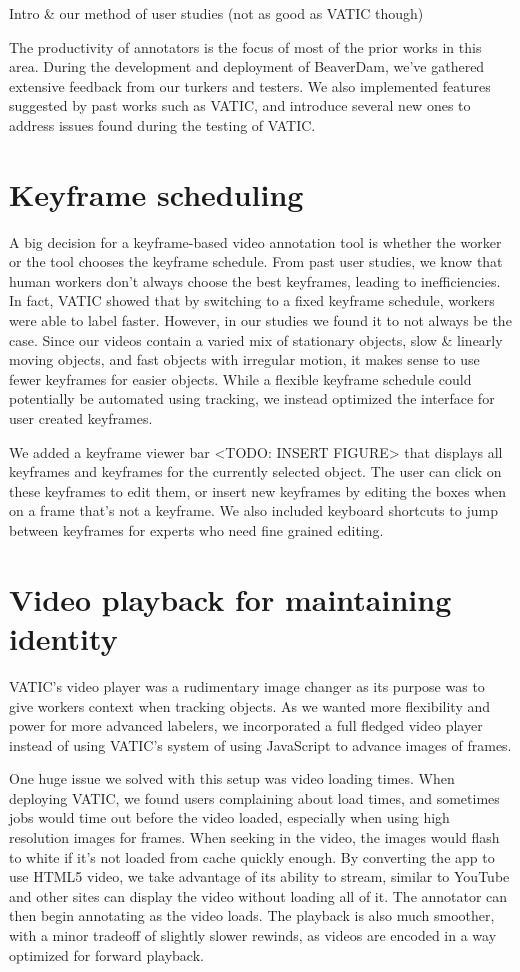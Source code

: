 
Intro \& our method of user studies (not as good as VATIC though)

The productivity of annotators is the focus of most of the prior works in this area.
During the development and deployment of BeaverDam, we've gathered extensive feedback from our turkers and testers.
We also implemented features suggested by past works such as VATIC,
and introduce several new ones to address issues found during the testing of VATIC.

\section{Keyframe scheduling}

A big decision for a keyframe-based video annotation tool is whether the worker or the tool chooses the keyframe schedule. 
From past user studies, we know that human workers don't always choose the best keyframes, leading to inefficiencies. 
In fact, VATIC showed that by switching to a fixed keyframe schedule, workers were able to label faster.
However, in our studies we found it to not always be the case. 
Since our videos contain a varied mix of stationary objects, slow \& linearly moving objects, and fast objects with irregular motion, it makes sense to use fewer keyframes for easier objects. 
While a flexible keyframe schedule could potentially be automated using tracking, we instead optimized the interface for user created keyframes.

We added a keyframe viewer bar <TODO: INSERT FIGURE> that displays all keyframes and keyframes for the currently selected object. 
The user can click on these keyframes to edit them, or insert new keyframes by editing the boxes when on a frame that's not a keyframe.
We also included keyboard shortcuts to jump between keyframes for experts who need fine grained editing.

\section{Video playback for maintaining identity}

VATIC's video player was a rudimentary image changer as its purpose was to give workers context when tracking objects.
As we wanted more flexibility and power for more advanced labelers, we incorporated a full fledged video player instead of using VATIC's system of using JavaScript to advance images of frames.

One huge issue we solved with this setup was video loading times.
When deploying VATIC, we found users complaining about load times, and sometimes jobs would time out before the video loaded, especially when using high resolution images for frames.
When seeking in the video, the images would flash to white if it's not loaded from cache quickly enough.
By converting the app to use HTML5 video, we take advantage of its ability to stream, similar to YouTube and other sites can display the video without loading all of it.
The annotator can then begin annotating as the video loads.
The playback is also much smoother, with a minor tradeoff of slightly slower rewinds, as videos are encoded in a way optimized for forward playback.

